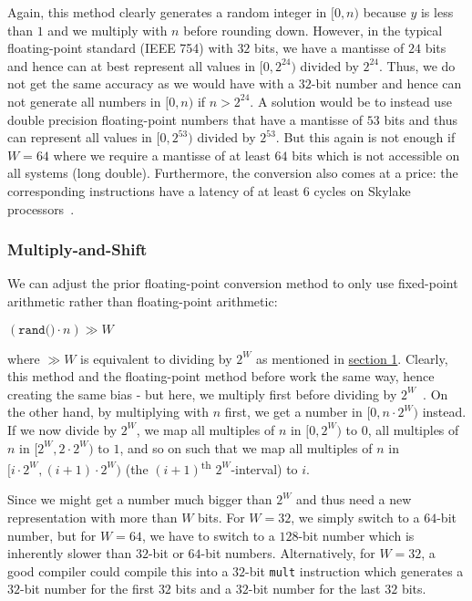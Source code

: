 \documentclass[a4paper, UKenglish, cleveref, autoref, thm-restate]{lipics-v2021}
\begin{document}
Again, this method clearly generates a random integer in $[0,n)$ because $y$ is less than $1$ and we multiply with $n$ before rounding down.
However, in the typical floating-point standard (IEEE 754) with $32$ bits, we have a mantisse of $24$ bits and hence can at best represent all values in $[0,2^{24})$ divided by $2^{24}$.
Thus, we do not get the same accuracy as we would have with a $32$-bit number and hence can not generate all numbers in $[0,n)$ if $n > 2^{24}$.
A solution would be to instead use double precision floating-point numbers that have a mantisse of $53$ bits and thus can represent all values in $[0,2^{53})$ divided by $2^{53}$.
But this again is not enough if $W = 64$ where we require a mantisse of at least $64$ bits which is not accessible on all systems (long double).
Furthermore, the conversion also comes at a price: the corresponding instructions have a latency of at least $6$ cycles on Skylake processors~\cite{Instructions}.


\subsubsection{Multiply-and-Shift}\label{sec:2.1.3}
We can adjust the prior floating-point conversion method to only use fixed-point arithmetic rather than floating-point arithmetic:
\begin{center}
    $\left(\texttt{rand()} \cdot n\right) \gg W$
\end{center}
where $\gg W$ is equivalent to dividing by $2^W$ as mentioned in \hyperref[sec:1.2]{section 1}.
Clearly, this method and the floating-point method before work the same way, hence creating the same bias - but here, we multiply first before dividing by $2^W$~\cite{MultShift}.
On the other hand, by multiplying with $n$ first, we get a number in $[0,n \cdot 2^W)$ instead.
If we now divide by $2^W$, we map all multiples of $n$ in $[0,2^W)$ to $0$, all multiples of $n$ in $[2^W, 2 \cdot 2^W)$ to $1$, and so on such that we map all multiples of $n$ in $[i \cdot 2^W, (i + 1) \cdot 2^W)$ (the $(i + 1)$\textsuperscript{th} $2^W$-interval) to $i$.

Since we might get a number much bigger than $2^W$ and thus need a new representation with more than $W$ bits.
For $W = 32$, we simply switch to a $64$-bit number, but for $W = 64$, we have to switch to a $128$-bit number which is inherently slower than $32$-bit or $64$-bit numbers.
Alternatively, for $W = 32$, a good compiler could compile this into a $32$-bit \texttt{mult} instruction which generates a $32$-bit number for the first $32$ bits and a $32$-bit number for the last $32$ bits.
\end{document}
